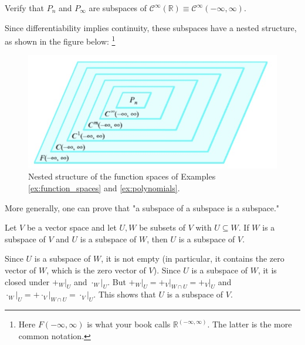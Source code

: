 \documentclass[12pt,letterpaper,reqno]{article}
\numberwithin{equation}{section}
\newcommand{\R}{\ensuremath{\mathbb R}}
\begin{document}
\begin{exercise}
Verify that $P_n$ and $P_\infty$ are subspaces of $\mathscr{C}^\infty(\R)\equiv \mathscr{C}^\infty(-\infty,\infty)$.
\end{exercise}

Since differentiability implies continuity, these subspaces have a nested structure, as shown in the figure below: \footnote{Here $F(-\infty,\infty)$ is what your book calls $\mathbb{R}^{(-\infty,\infty)}$. The latter is the more common notation.}

\begin{figure}[h]
	\begin{center}
	\includegraphics[scale=0.5]{figures_mvc/nested}
\end{center}
\caption{Nested structure of the function spaces of Examples \ref{ex:function_spaces} and \ref{ex:polynomials}.}
\end{figure}

More generally, one can prove that "a subspace of a subspace is a subspace."

\begin{thm}\label{thm:transitivity_of_subspaces}
	Let $V$ be a vector space and let $U,W$ be subsets of $V$ with $U \subseteq W$. If $W$ is a subspace of $V$ and $U$ is a subspace of $W$, then $U$ is a subspace of $V$.
\end{thm}

\begin{pf}
	Since $U$ is a subspace of $W$, it is not empty (in particular, it contains the zero vector of $W$, which is the zero vector of $V$). Since $U$ is a subspace of $W$, it is closed under $+_W\vert_U$ and $\cdot_W\vert_U$. But $+_W\vert_U=+_V\vert_{W \cap U}=+_V\vert_U$ and $\cdot_W\vert_U=+\cdot_V\vert_{W \cap U}=\cdot_V\vert_U$. This shows that $U$ is a subspace of $V$.
\end{pf}
\end{document}

